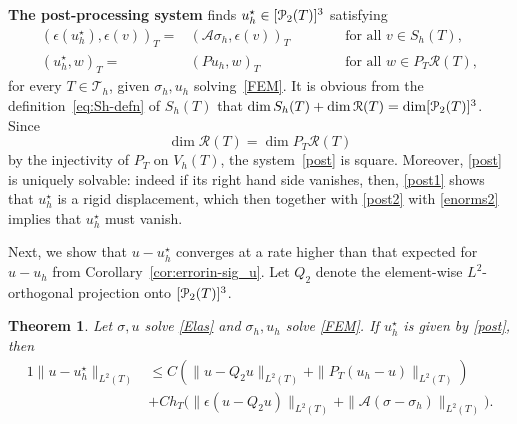 \documentclass[12pt]{amsart}
\numberwithin{equation}{section}
\newtheorem{theorem}{Theorem}[section]
\theoremstyle{definition}
\theoremstyle{remark}
\renewcommand{\(}{\bigl(}
\renewcommand{\)}{\bigr)}
\newcommand{\ust}{u^\star}
\newcommand{\pol}{\EuScript{P}}
\newcommand{\Aa}{\mathcal{A}}
\newcommand{\Th}{\mathcal{T}_h}
\newcommand{\RM}{\mathcal{R}}
\begin{document}
{\bf{The post-processing system}}
finds $\ust_h \in [\pol_2(T)]^3$ satisfying
\begin{subequations}\label{post}
\begin{alignat}{2}
(\epsilon(\ust_h), \epsilon(v))_T=& (\Aa \sigma_h, \epsilon(v))_T \qquad && {\text{ for all }} v \in S_h(T), \label{post1}\\
(\ust_h, w)_T=& (Pu_h,w)_T \qquad  && {\text{ for all }} w \in P_T \RM(T), \label{post2}
\end{alignat}
\end{subequations}
for every $T \in \Th$, given $\sigma_h, u_h$ solving~\eqref{FEM}.    It is obvious from the
definition~\eqref{eq:Sh-defn} of $S_h(T)$ that
$\dim S_h(T) + \dim \RM(T) = \dim [\pol_2(T)]^3$.  Since
\begin{equation}
  \label{eq:6}
  \dim \RM(T) = \dim P_T \RM(T)  
\end{equation}
by the injectivity of  $P_T$ on $V_h(T)$, 
the system~\eqref{post} is
square. Moreover, \eqref{post} is uniquely solvable: indeed 
if its right hand side vanishes,
then, \eqref{post1} shows that $\ust_h$ is a rigid displacement, which then together with \eqref{post2} with \eqref{enorms2} implies that $\ust_h$ must vanish.


Next, we show that $u - u_h^\star$ converges at a rate higher than
that expected for $u-u_h$ from Corollary~\ref{cor:errorin-sig_u}.  Let
$Q_2$ denote the element-wise $L^2$-orthogonal projection onto
$[\pol_2(T)]^3$.



\begin{theorem}\label{mainthmpost}
Let $\sigma, u$ solve \eqref{Elas} and $\sigma_h, u_h$ solve \eqref{FEM}. If $\ust_h$ is given by \eqref{post}, then
\begin{alignat*}{1}
  \|u-\ust_h\|_{L^2(T)} & \le  C (\|u-Q_2 u\|_{L^2(T)}+\|P_T(u_h- u)\|_{L^2(T)})\\
  & + C h_T \big(\|\epsilon(u-Q_2u)\|_{L^2(T)}+ \|\Aa(\sigma-\sigma_h)\|_{L^2(T)}\big). 
\end{alignat*}
\end{theorem}
\end{document}
